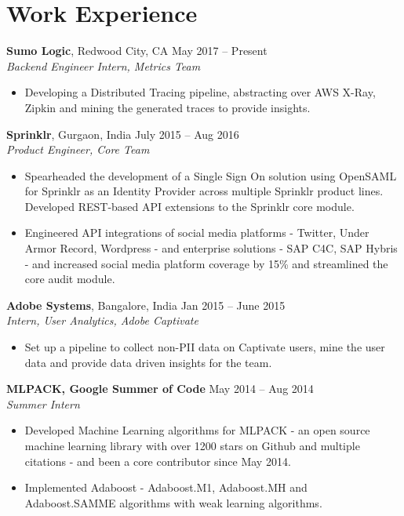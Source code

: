 \documentclass[letterpaper]{article}
\begin{document}
\section*{Work Experience}
\textbf{Sumo Logic}, Redwood City, CA \hfill May 2017 -- Present\\
\emph{Backend Engineer Intern, Metrics Team}\\
\vspace{-6mm}
\begin{itemize}
\item Developing a Distributed Tracing pipeline, abstracting over AWS X-Ray, Zipkin and mining the generated traces to provide insights.
\end{itemize}
\vspace{-1mm}
\textbf{Sprinklr}, Gurgaon, India \hfill July 2015 -- Aug 2016\\
\emph{Product Engineer, Core Team}\\
\vspace{-6mm}
\begin{itemize}
\item Spearheaded the development of a Single Sign On solution using OpenSAML for Sprinklr as an Identity Provider  across multiple Sprinklr product lines. Developed REST-based API extensions to the Sprinklr core module.
\vspace{-2mm}
\item Engineered API integrations of social media platforms - Twitter, Under Armor Record, Wordpress - and enterprise solutions - SAP C4C, SAP Hybris - and increased social media platform coverage by 15\% and streamlined the core audit module.
\end{itemize}

\vspace{-0.5mm}
\textbf{Adobe Systems}, Bangalore, India \hfill Jan 2015 -- June 2015\\
\emph{Intern, User Analytics, Adobe Captivate}\\
\vspace{-6mm}
\begin{itemize}
\item Set up a pipeline to collect non-PII data on Captivate users, mine the user data and provide data driven insights for the team.
\end{itemize}

\vspace{-0.6mm}

\textbf{MLPACK, Google Summer of Code} \hfill May 2014 -- Aug 2014\\
\emph{Summer Intern}\\
\vspace{-6mm}
\begin{itemize}
\item Developed Machine Learning algorithms for MLPACK - an open source machine learning library with over 1200 stars on Github and multiple citations - and been a core contributor since May 2014.
\vspace{-2mm}
\item Implemented Adaboost - Adaboost.M1, Adaboost.MH and Adaboost.SAMME algorithms with weak learning algorithms.
\end{itemize}
\vspace{-1mm}
\end{document}
